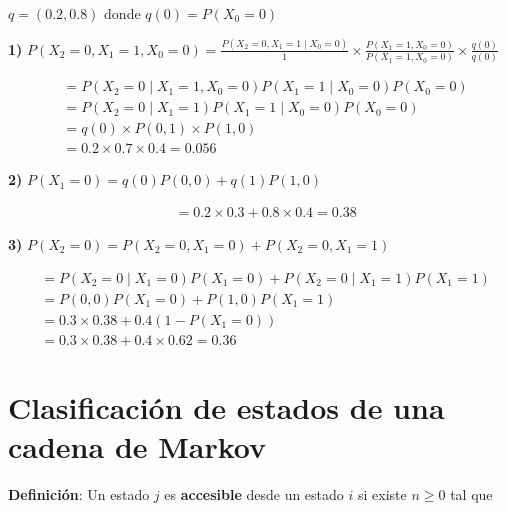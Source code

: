 \documentclass[12pt,a4paper]{article}
\begin{document}
$q = (0.2, 0.8)$ donde $q(0) = P(X_0 = 0)$

\begin{center}
\end{center}

\textbf{1)} $P(X_2 = 0, X_1 = 1, X_0 = 0) = \frac{P(X_2 = 0, X_1 = 1 \mid X_0 = 0)}{1} \times \frac{P(X_1 = 1, X_0 = 0)}{P(X_1 = 1, X_0 = 0)} \times \frac{q(0)}{q(0)}$

\begin{align*}
&= P(X_2 = 0 \mid X_1 = 1, X_0 = 0) P(X_1 = 1 \mid X_0 = 0) P(X_0 = 0) \\
&= P(X_2 = 0 \mid X_1 = 1) P(X_1 = 1 \mid X_0 = 0) P(X_0 = 0) \\
&= q(0) \times P(0,1) \times P(1,0) \\
&= 0.2 \times 0.7 \times 0.4 = 0.056
\end{align*}

\textbf{2)} $P(X_1 = 0) = q(0) P(0,0) + q(1) P(1,0)$

\begin{align*}
&= 0.2 \times 0.3 + 0.8 \times 0.4 = 0.38
\end{align*}

\textbf{3)} $P(X_2 = 0) = P(X_2 = 0, X_1 = 0) + P(X_2 = 0, X_1 = 1)$

\begin{align*}
&= P(X_2 = 0 \mid X_1 = 0) P(X_1 = 0) + P(X_2 = 0 \mid X_1 = 1) P(X_1 = 1) \\
&= P(0,0) P(X_1 = 0) + P(1,0) P(X_1 = 1) \\
&= 0.3 \times 0.38 + 0.4 (1 - P(X_1 = 0)) \\
&= 0.3 \times 0.38 + 0.4 \times 0.62 = 0.36
\end{align*}

\section*{Clasificación de estados de una cadena de Markov}

\textbf{Definición}: Un estado $j$ es \textbf{accesible} desde un estado $i$ si existe $n \geq 0$ tal que
\end{document}
